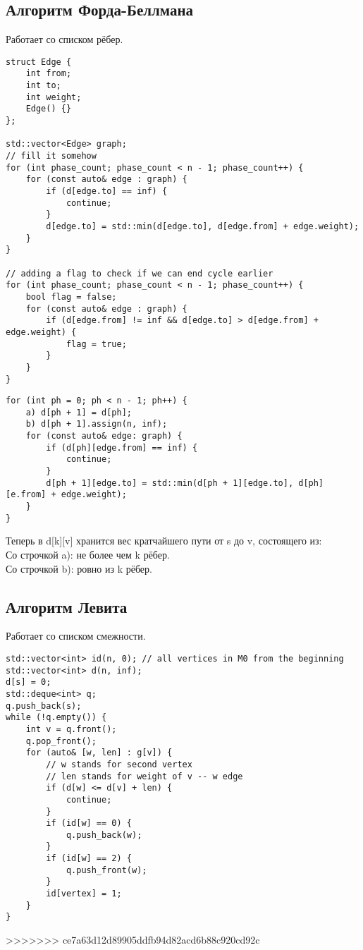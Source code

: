 \documentclass[12pt, a4paper]{article}
\begin{document}
    \subsection*{Алгоритм Форда-Беллмана}
    Работает со списком рёбер.
    \begin{lstlisting}
struct Edge {
    int from;
    int to;
    int weight;
    Edge() {}
};

std::vector<Edge> graph;
// fill it somehow
for (int phase_count; phase_count < n - 1; phase_count++) {
    for (const auto& edge : graph) {
        if (d[edge.to] == inf) {
            continue;
        }
        d[edge.to] = std::min(d[edge.to], d[edge.from] + edge.weight);
    }
}

// adding a flag to check if we can end cycle earlier
for (int phase_count; phase_count < n - 1; phase_count++) {
    bool flag = false;
    for (const auto& edge : graph) {
        if (d[edge.from] != inf && d[edge.to] > d[edge.from] + edge.weight) {
            flag = true;
        }
    }
}
    \end{lstlisting}
    \begin{lstlisting}
for (int ph = 0; ph < n - 1; ph++) {
    a) d[ph + 1] = d[ph];
    b) d[ph + 1].assign(n, inf);
    for (const auto& edge: graph) {
        if (d[ph][edge.from] == inf) {
            continue;
        }
        d[ph + 1][edge.to] = std::min(d[ph + 1][edge.to], d[ph][e.from] + edge.weight);
    }
}
    \end{lstlisting}
    Теперь в d[k][v] хранится вес кратчайшего пути от s до v, состоящего из:\\
    Со строчкой a): не более чем k рёбер.\\
    Со строчкой b): ровно из k рёбер.
    \newpage\subsection*{Алгоритм Левита}
    Работает со списком смежности.
    \begin{lstlisting}
std::vector<int> id(n, 0); // all vertices in M0 from the beginning
std::vector<int> d(n, inf);
d[s] = 0;
std::deque<int> q;
q.push_back(s);
while (!q.empty()) {
    int v = q.front();
    q.pop_front();
    for (auto& [w, len] : g[v]) {
        // w stands for second vertex
        // len stands for weight of v -- w edge 
        if (d[w] <= d[v] + len) {
            continue;
        }
        if (id[w] == 0) {
            q.push_back(w);
        }
        if (id[w] == 2) {
            q.push_front(w);
        }
        id[vertex] = 1;
    }
}
    \end{lstlisting}
>>>>>>> ce7a63d12d89905ddfb94d82acd6b88c920cd92c
\end{document}
